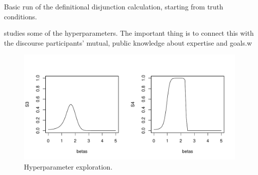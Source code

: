 \begin{table}[htp]
  \centering

  \caption{Basic run of the definitional disjunction calculation, starting from truth conditions.}
\end{table}


 studies some of the hyperparameters. The
important thing is to connect this with the discourse participants'
mutual, public knowledge about expertise and goals.w


\begin{figure}[htp]
  \centering
  \includegraphics[width=1\textwidth]{images/S3andS4}
  \caption{Hyperparameter exploration.}
  \label{fig:S3andS4}
\end{figure}




